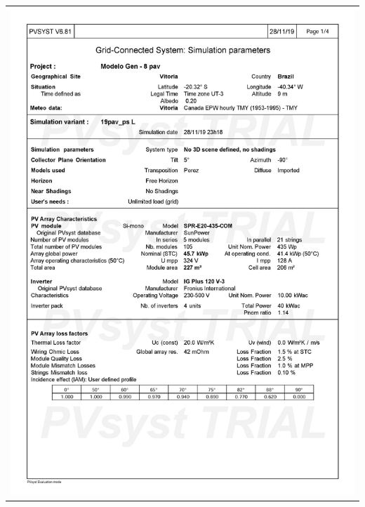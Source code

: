\begin{table}[H]
    \centering
    \begin{tabular}{l}
        \includegraphics[width=\textwidth]{figures/attachments/resultpv29.jpg}
    \end{tabular}
\end{table}
\pagebreak
